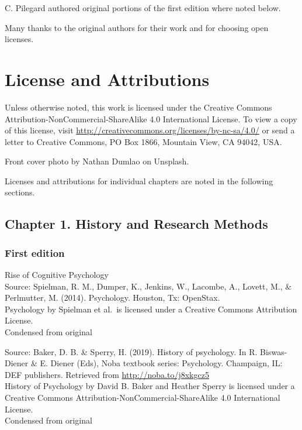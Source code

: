 \documentclass[
]{krantz}
\begin{document}
C. Pilegard authored original portions of the first edition where noted below.

Many thanks to the original authors for their work and for choosing open licenses.

\hypertarget{license-and-attributions}{%
\section*{License and Attributions}\label{license-and-attributions}}


Unless otherwise noted, this work is licensed under the Creative Commons Attribution-NonCommercial-ShareAlike 4.0 International License. To view a copy of this license, visit \url{http://creativecommons.org/licenses/by-nc-sa/4.0/} or send a letter to Creative Commons, PO Box 1866, Mountain View, CA 94042, USA.

Front cover photo by Nathan Dumlao on Unsplash.

Licenses and attributions for individual chapters are noted in the following sections.

\hypertarget{chapter-1.-history-and-research-methods}{%
\subsection*{Chapter 1. History and Research Methods}\label{chapter-1.-history-and-research-methods}}


\hypertarget{first-edition-1}{%
\subsubsection*{First edition}\label{first-edition-1}}


Rise of Cognitive Psychology\\
Source: Spielman, R. M., Dumper, K., Jenkins, W., Lacombe, A., Lovett, M., \& Perlmutter, M. (2014). Psychology. Houston, Tx: OpenStax.\\
Psychology by Spielman et al.~is licensed under a Creative Commons Attribution License.\\
Condensed from original

Source: Baker, D. B. \& Sperry, H. (2019). History of psychology. In R. Biswas-Diener \& E. Diener (Eds), Noba textbook series: Psychology. Champaign, IL: DEF publishers. Retrieved from \url{http://noba.to/j8xkgcz5}\\
History of Psychology by David B. Baker and Heather Sperry is licensed under a Creative Commons Attribution-NonCommercial-ShareAlike 4.0 International License.\\
Condensed from original
\end{document}

